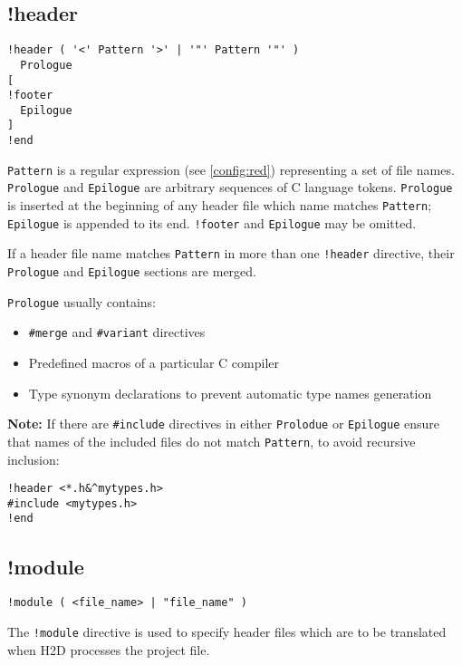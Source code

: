 \subsection{!header}
\label{project:header}

\begin{verbatim}
!header ( '<' Pattern '>' | '"' Pattern '"' )
  Prologue
[
!footer
  Epilogue
]
!end
\end{verbatim}

\verb'Pattern' is a regular expression (see \ref{config:red})
representing a set of file names.
{\tt Prologue} and {\tt Epilogue} are arbitrary sequences
of C language tokens. {\tt Prologue} is inserted at the beginning
of any header file which name matches \verb'Pattern'; {\tt Epilogue} is
appended to its end. {\tt !footer} and {\tt Epilogue} may be omitted.

If a header file name matches \verb'Pattern' in more than one
\verb'!header' directive, their \verb'Prologue' and \verb'Epilogue'
sections are merged.

{\tt Prologue} usually contains:
\begin{itemize}
\item {\tt \#merge} and {\tt \#variant} directives
\item Predefined macros of a particular C compiler
\item Type synonym declarations to prevent automatic type names generation %
\end{itemize}

{\bf Note:} If there are \verb'#include' directives in either
\verb'Prolodue' or \verb'Epilogue' ensure that names of the
included files do not match \verb'Pattern', to avoid recursive inclusion:

\begin{verbatim}
!header <*.h&^mytypes.h>
#include <mytypes.h>
!end
\end{verbatim}

\subsection{!module}
\label{project:module}

\begin{verbatim}
!module ( <file_name> | "file_name" )
\end{verbatim}

The \verb'!module' directive is used to specify header files which
are to be translated when H2D processes the project file.

